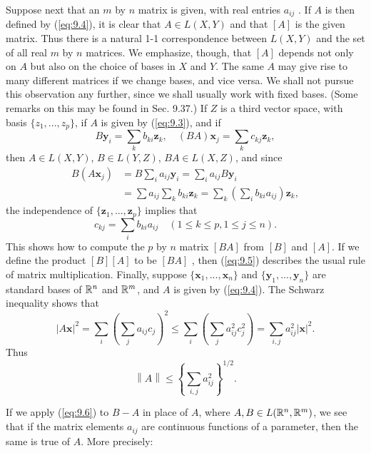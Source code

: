 \begin{myDef}
    Suppose next that an $m$ by $n$ matrix is given, with real entries $a_{ij}$ . 
    If $A$ is then defined by (\ref{eq:9.4}), 
    it is clear that $A \in L(X, Y)$ and that $[A]$ is the given matrix.
    Thus there is a natural 1-1 correspondence between $L(X, Y)$ and the set of all real $m$ by $n$ matrices. 
    We emphasize, though, that $[A]$ depends not only on $A$ but also on the choice of bases in $X$ and $Y$. 
    The same $A$ may give rise to many different matrices if we change bases, and vice versa. 
    We shall not pursue this observation any further, since we shall usually work with fixed bases. 
    (Some remarks on this may be found in Sec. 9.37.)
    If $Z$ is a third vector space, with basis $\{z_1, ... , z_p\}$, 
    if $A$ is given by (\ref{eq:9.3}), and if 
    \begin{equation*}
        B \mathbf{y}_i = \sum_k b_{ki} \mathbf{z}_k, \quad
        (BA) \mathbf{x}_j = \sum_k c_{kj} \mathbf{z}_k, 
    \end{equation*}
    then $A \in L(X, Y)$, $B \in L(Y, Z)$, $BA \in L(X, Z)$, and since
    \begin{align*}
        B(A \mathbf{x}_j)
        &= B \sum_i a_{ij} \mathbf{y}_i 
        = \sum_i a_{ij} B \mathbf{y}_i \\
        &= \sum a_{ij} \sum_k b_{ki} \mathbf{z}_k 
        = \sum_k \left( \sum_i b_{ki} a_{ij} \right) \mathbf{z}_k,
    \end{align*}
    the independence of $\{\mathbf{z}_1,...,\mathbf{z}_p\}$ implies that 
    \begin{equation}
        \label{eq:9.5}
        c_{kj} = \sum_i b_{ki} a_{ij}
        \quad 
        (1 \leq k \leq p,1 \leq j \leq n).
    \end{equation}
    This shows how to compute the $p$ by $n$ matrix $[BA]$ from $[B]$ and $[A]$.
    If we define the product $[B][A]$ to be $[BA]$ , then (\ref{eq:9.5}) describes the usual rule of matrix multiplication.
    Finally, suppose $\{\mathbf{x}_1,...,\mathbf{x}_n\}$ and $\{\mathbf{y}_1,...,\mathbf{y}_n\}$ are standard bases of ${\protect\mathbb R}^n$ and ${\protect\mathbb R}^m$, and $A$ is given by (\ref{eq:9.4}).
    The Schwarz inequality shows that 
    \begin{equation*}
        \left| A \mathbf{x} \right|^2 = 
        \sum_i \left( \sum_j a_{ij} c_j \right)^2 \leq
        \sum_i \left( \sum_j a_{ij}^2 c_j^2 \right) =
        \sum_{i, j} a_{ij}^2 \left| \mathbf{x} \right|^2 .
    \end{equation*}
    Thus 
    \begin{equation}
        \label{eq:9.6}
        \left\| A \right\| \leq 
        \left\{ \sum_{i, j} a_{ij}^2 \right\}^{1/2} .
    \end{equation}

    If we apply (\ref{eq:9.6}) to $B - A$ in place of $A$, 
    where $A, B \in L({\protect\mathbb R}^n, {\protect\mathbb R}^m)$, 
    we see that if the matrix elements $a_{ij}$ are continuous functions of a parameter, then the same is true of $A$. More precisely:
\end{myDef}

